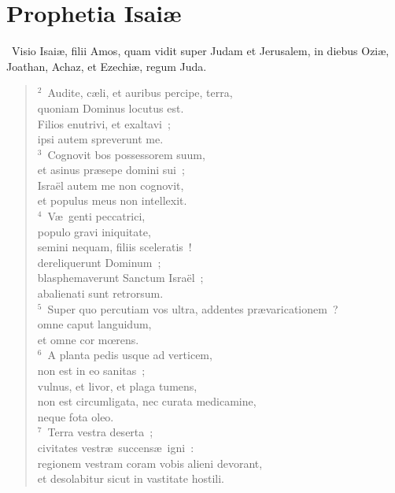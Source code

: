 \clearpage
{\centering \section*{Prophetia Isaiæ}}\thispagestyle{empty}

~Visio Isai\ae , filii Amos, quam vidit super Judam et Jerusalem, in diebus Ozi\ae , Joathan, Achaz, et Ezechi\ae , regum Juda.


\begin{flushleft}\begin{verse}\vspace{6pt}${}^{2}$~Audite, c\ae li, et auribus percipe, terra,\\ quoniam Dominus locutus est.\\ Filios enutrivi, et exaltavi~;\\ ipsi autem spreverunt me.\\
${}^{3}$~Cognovit bos possessorem suum,\\ et asinus pr\ae sepe domini sui~;\\ Isra\"el autem me non cognovit,\\ et populus meus non intellexit.\\
${}^{4}$~V\ae\ genti peccatrici,\\ populo gravi iniquitate,\\ semini nequam, filiis sceleratis~!\\ dereliquerunt Dominum~;\\ blasphemaverunt Sanctum Isra\"el~;\\ abalienati sunt retrorsum.\\
${}^{5}$~Super quo percutiam vos ultra, addentes pr\ae varicationem~?\\ omne caput languidum,\\ et omne cor mœrens.\\
${}^{6}$~A planta pedis usque ad verticem,\\ non est in eo sanitas~;\\ vulnus, et livor, et plaga tumens,\\ non est circumligata, nec curata medicamine,\\ neque fota oleo.\\
${}^{7}$~Terra vestra deserta~;\\ civitates vestr\ae\ succens\ae\ igni~:\\ regionem vestram coram vobis alieni devorant,\\ et desolabitur sicut in vastitate hostili.\\

\end{verse}
\end{flushleft}

